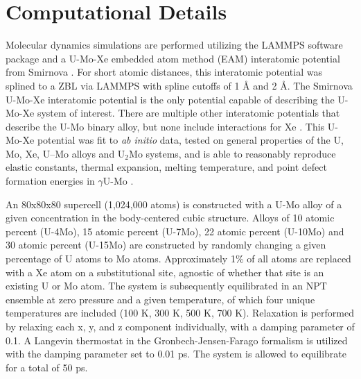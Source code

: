 \documentclass[review]{elsarticle}
\begin{document}
\section{Computational Details}

Molecular dynamics simulations are performed utilizing the LAMMPS \cite{plimpton1995} software package and a U-Mo-Xe embedded atom method (EAM) interatomic potential from Smirnova \cite{smirnovaUMo}. For short atomic distances, this interatomic potential was splined to a ZBL \cite{zbl} via LAMMPS with spline cutoffs of 1 {\AA} and 2 {\AA}. The Smirnova U-Mo-Xe interatomic potential is the only potential capable of describing the U-Mo-Xe system of interest. There are multiple other interatomic potentials that describe the U-Mo binary alloy, but none include interactions for Xe \cite{smirnovaADP, starikov2018}. This U-Mo-Xe potential was fit to \textit{ab initio} data, tested on general properties of the U, Mo, Xe, U–Mo alloys and U$_2$Mo systems, and is able to reasonably reproduce elastic constants, thermal expansion, melting temperature, and point defect formation energies in $\gamma$U-Mo \cite{smirnovaUMo}.

An 80x80x80 supercell (1,024,000 atoms) is constructed with a U-Mo alloy of a given concentration in the body-centered cubic structure. Alloys of 10 atomic percent (U-4Mo), 15 atomic percent (U-7Mo), 22 atomic percent (U-10Mo) and 30 atomic percent (U-15Mo) are constructed by randomly changing a given percentage of U atoms to Mo atoms. Approximately 1\% of all atoms are replaced with a Xe atom on a substitutional site, agnostic of whether that site is an existing U or Mo atom. The system is subsequently equilibrated in an NPT ensemble at zero pressure and a given temperature, of which four unique temperatures are included (100 K, 300 K, 500 K, 700 K). Relaxation is performed by relaxing each x, y, and z component individually, with a damping parameter of 0.1. A Langevin thermostat in the Gronbech-Jensen-Farago \cite{gjf2013, gjf2014} formalism is utilized with the damping parameter set to 0.01 ps. The system is allowed to equilibrate for a total of 50 ps.
\end{document}
